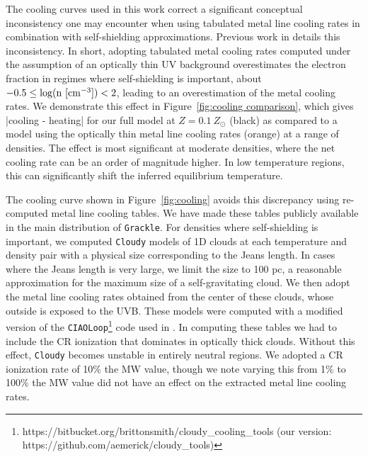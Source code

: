\documentclass[twocolumn]{aastex61}
\begin{document}
The cooling curves used in this work correct a significant conceptual inconsistency one may encounter when using tabulated metal line cooling rates in combination with self-shielding approximations. Previous work in \cite{Hu2017} details this inconsistency. In short, adopting tabulated metal cooling rates computed under the assumption of an optically thin UV background overestimates the electron fraction in regimes where self-shielding is important, about $-0.5 \leq \rm{log(n~[cm^{-3}])} < 2$, leading to an overestimation of the metal cooling rates. We demonstrate this effect in Figure~\ref{fig:cooling comparison}, which gives |cooling - heating| for our full model at $Z = 0.1~Z_{\odot}$ (black) as compared to a model using the optically thin metal line cooling rates (orange) at a range of densities. The effect is most significant at moderate densities, where the net cooling rate can be an order of magnitude higher. In low temperature regions, this can significantly shift the inferred equilibrium temperature.

The cooling curve shown in Figure~\ref{fig:cooling} avoids this discrepancy using re-computed metal line cooling tables. We have made these tables publicly available in the main distribution of \texttt{Grackle}. For densities where self-shielding is important, we computed \texttt{Cloudy} models of 1D clouds at each temperature and density pair with a physical size corresponding to the Jeans length. In cases where the Jeans length is very large, we limit the size to 100 pc, a reasonable approximation for the maximum size of a self-gravitating cloud. We then adopt the metal line cooling rates obtained from the center of these clouds, whose outside is exposed to the UVB. These models were computed with a modified version of the \texttt{CIAOLoop}\footnote{https://bitbucket.org/brittonsmith/cloudy\_cooling\_tools (our version: https://github.com/aemerick/cloudy\_tools)} code used in \citet{2008MNRAS.385.1443S}. In computing these tables we had to include the CR ionization that dominates in optically thick clouds. Without this effect, \texttt{Cloudy} becomes unstable in entirely neutral regions. We adopted a CR ionization rate of 10\% the MW value, though we note varying this from 1\% to 100\% the MW value did not have an effect on the extracted metal line cooling rates. 
\end{document}
